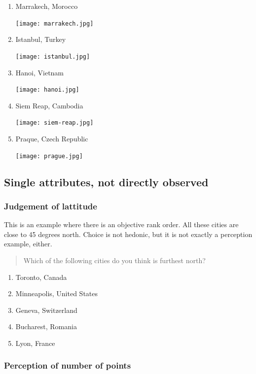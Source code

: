 \documentclass[11pt,letter]{amsart}
\begin{document}
\begin{enumerate}
\item Marrakech, Morocco

\texttt{[image: marrakech.jpg]}

\item Istanbul, Turkey

\texttt{[image: istanbul.jpg]}

\item Hanoi, Vietnam

\texttt{[image: hanoi.jpg]}

\item Siem Reap, Cambodia

\texttt{[image: siem-reap.jpg]}

\item Praque, Czech Republic

\texttt{[image: prague.jpg]}
\end{enumerate}

\subsection{Single attributes, not directly observed}

\subsubsection{Judgement of lattitude}

This is an example where there is an objective rank order. All these cities
are close to 45 degrees north. Choice is not hedonic, but it is not exactly
a perception example, either.

\begin{quotation}
Which of the following cities do you think is furthest north?
\end{quotation}

\begin{enumerate}
\item Toronto, Canada 

\item Minneapolis, United States 

\item Geneva, Switzerland 

\item Bucharest, Romania 

\item Lyon, France
\end{enumerate}

\subsubsection{Perception of number of points}
\end{document}
